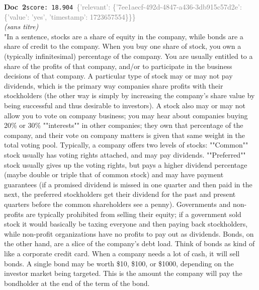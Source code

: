 \documentclass[a4paper,11pt]{article}
\begin{document}
\begin{docenv}
{\footnotesize\textcolor{doccolor}{\textbf{Doc~2}}}\hfill{\tiny\texttt{score:~18.904}}\ {\tiny\textcolor{gray}{\{'relevant': \{'7ee1aecf-492d-4847-a436-3db915c57d2e': \{'value': 'yes', 'timestamp': 1723657554\}\}\}}}\\[3pt]
{\small\textit{(sans titre)}}\\[2pt]
\vspace{2pt}
{\footnotesize 
"In a sentence, stocks are a share of equity in the company, while bonds are a share of credit to the company. When you buy one share of stock, you own a (typically infinitesimal) percentage of the company. You are usually entitled to a share of the profits of that company, and/or to participate in the business decisions of that company. A particular type of stock may or may not pay dividends, which is the primary way companies share profits with their stockholders (the other way is simply by increasing the company's share value by being successful and thus desirable to investors). A stock also may or may not allow you to vote on company business; you may hear about companies buying 20\% or 30\% ""interests"" in other companies; they own that percentage of the company, and their vote on company matters is given that same weight in the total voting pool. Typically, a company offers two levels of stocks: ""Common"" stock usually has voting rights attached, and may pay dividends. ""Preferred"" stock usually gives up the voting rights, but pays a higher dividend percentage (maybe double or triple that of common stock) and may have payment guarantees (if a promised dividend is missed in one quarter and then paid in the next, the preferred stockholders get their dividend for the past and present quarters before the common shareholders see a penny). Governments and non-profits are typically prohibited from selling their equity; if a government sold stock it would basically be taxing everyone and then paying back stockholders, while non-profit organizations have no profits to pay out as dividends. Bonds, on the other hand, are a slice of the company's debt load. Think of bonds as kind of like a corporate credit card. When a company needs a lot of cash, it will sell bonds. A single bond may be worth \$10, \$100, or \$1000, depending on the investor market being targeted. This is the amount the company will pay the bondholder at the end of the term of the bond.}
\end{docenv}
\end{document}
